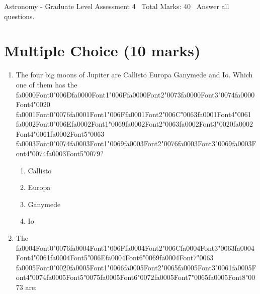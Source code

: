 \documentclass[12pt]{article}
\begin{document}
\begin{center}
Astronomy - Graduate Level Assessment 4 \
Total Marks: 40 \
Answer all questions.
\end{center}

\section*{Multiple Choice (10 marks)}
\begin{enumerate}[label=\arabic*.]
\item The four big moons of Jupiter are Callisto Europa Ganymede and Io. Which one of them has
the {\csname fa0000Font0\endcsname\char"006D}{\csname fa0000Font1\endcsname\char"006F}{\csname fa0000Font2\endcsname\char"0073}{\csname fa0000Font3\endcsname\char"0074}{\csname fa0000Font4\endcsname\char"0020} {\csname fa0001Font0\endcsname\char"0076}{\csname fa0001Font1\endcsname\char"006F}{\csname fa0001Font2\endcsname\char"006C}{\char"0063}{\csname fa0001Font4\endcsname\char"0061} {\csname fa0002Font0\endcsname\char"006E}{\csname fa0002Font1\endcsname\char"0069}{\csname fa0002Font2\endcsname\char"0063}{\csname fa0002Font3\endcsname\char"0020}{\csname fa0002Font4\endcsname\char"0061}{\csname fa0002Font5\endcsname\char"0063} {\csname fa0003Font0\endcsname\char"0074}{\csname fa0003Font1\endcsname\char"0069}{\csname fa0003Font2\endcsname\char"0076}{\csname fa0003Font3\endcsname\char"0069}{\csname fa0003Font4\endcsname\char"0074}{\csname fa0003Font5\endcsname\char"0079}?
\begin{enumerate}[label=(\alph*)]
    \item Callisto
    \item Europa
    \item Ganymede
    \item Io
\end{enumerate}
\item The {\csname fa0004Font0\endcsname\char"0076}{\csname fa0004Font1\endcsname\char"006F}{\csname fa0004Font2\endcsname\char"006C}{\csname fa0004Font3\endcsname\char"0063}{\csname fa0004Font4\endcsname\char"0061}{\csname fa0004Font5\endcsname\char"006E}{\csname fa0004Font6\endcsname\char"0069}{\csname fa0004Font7\endcsname\char"0063} {\csname fa0005Font0\endcsname\char"0020}{\csname fa0005Font1\endcsname\char"0066}{\csname fa0005Font2\endcsname\char"0065}{\csname fa0005Font3\endcsname\char"0061}{\csname fa0005Font4\endcsname\char"0074}{\csname fa0005Font5\endcsname\char"0075}{\csname fa0005Font6\endcsname\char"0072}{\csname fa0005Font7\endcsname\char"0065}{\csname fa0005Font8\endcsname\char"0073} are:

\end{enumerate}
\end{document}
